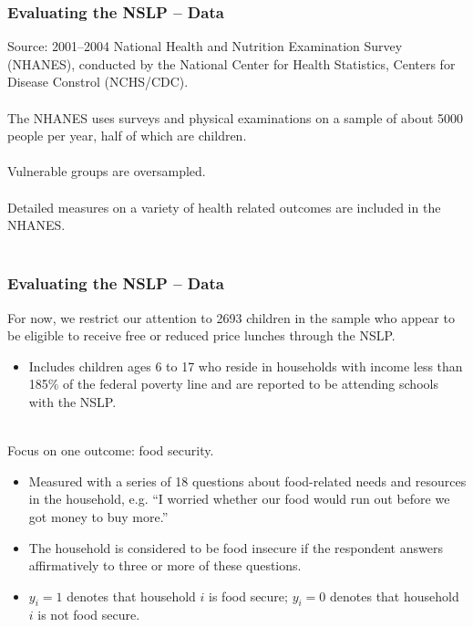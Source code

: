 \documentclass[xcolor=dvipsnames]{beamer}
\begin{document}
\begin{frame}
\frametitle{Evaluating the NSLP -- Data}
Source: 2001--2004 National Health and Nutrition Examination Survey (NHANES), conducted by the National Center for Health Statistics, Centers for Disease Constrol (NCHS/CDC).\\~\\

The NHANES uses surveys and physical examinations on a sample of about 5000 people per year, half of which are children.\\~\\

Vulnerable groups are oversampled. \\~\\

Detailed measures on a variety of health related outcomes are included in the NHANES.\\~\\

\end{frame}
    
\begin{frame}
  \frametitle{Evaluating the NSLP -- Data}
For now, we restrict our attention to 2693 children in the sample who appear to be eligible to receive free or reduced price lunches through the NSLP.

\begin{itemize}
\item Includes children ages 6 to 17 who reside in households with income less than 185\% of the federal poverty line and are reported to be attending schools with the NSLP.\\~\\
\end{itemize}

\pause Focus on one outcome: food security.

\begin{itemize}
\item Measured with a series of 18 questions about food-related needs and resources in the household, e.g. ``I worried whether our food would run out before we got money to buy more.'' 
\item The household is considered to be food insecure if the respondent answers affirmatively to three or more of these questions.
\item $y_i=1$ denotes that household $i$ is food secure; $y_i=0$ denotes that household $i$ is not food secure.
\end{itemize}

\end{frame}
\end{document}
